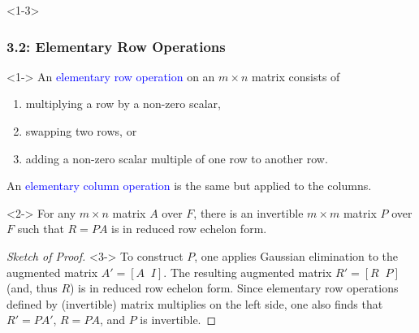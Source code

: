\documentclass[10pt,english,aspectratio=169]{beamer}
\begin{document}
\begin{frame}<1-3> \frametitle{3.2: Elementary Row Operations}

\vspace{-1.5mm}

\begin{definition}<1->
An \textcolor{blue}{elementary row operation} on an $m \times n$ matrix consists of
\begin{enumerate}
\setlength\itemsep{0.5mm}
\item multiplying a row by a non-zero scalar,
\item swapping two rows, or
\item adding a non-zero scalar multiple of one row to another row.
\end{enumerate}
An \textcolor{blue}{elementary column operation} is the same but applied to the columns.
\end{definition}

\vspace{-0.5mm}

\begin{lemma}<2->
For any $m\times n$ matrix $A$ over $F$, there is an invertible $m \times m$ matrix $P$ over $F$ such that $R=PA$ is in reduced row echelon form.
\end{lemma}

\vspace{-0.5mm}

\begin{proof}[Sketch of Proof]<3->
To construct $P$, one applies Gaussian elimination to the augmented matrix $A' = [A \;\; I]$.
The resulting augmented matrix $R' = [R \;\; P]$ (and, thus $R$) is in reduced row echelon form.
Since elementary row operations defined by (invertible) matrix multiplies on the left side, one also finds that $R' = P A'$, $R = PA$, and $P$ is invertible.
\end{proof}

\end{frame}
\end{document}
